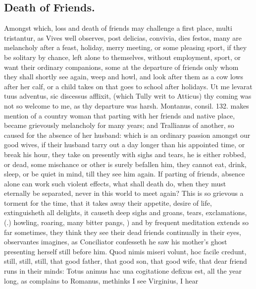 {{\subsection{Death of Friends.}
Amongst which, loss and death of friends may
challenge a first place, multi tristantur, as Vives well
observes, post delicias, convivia, dies festos, many are melancholy
after a feast, holiday, merry meeting, or some pleasing sport, if they
be solitary by chance, left alone to themselves, without employment,
sport, or want their ordinary companions, some at the departure of
friends only whom they shall shortly see again, weep and howl, and look
after them as a cow lows after her calf, or a child takes on that goes
to school after holidays. Ut me levarat tuus adventus, sic discessus
afflixit, (which Tully writ to Atticus) thy coming was not so
welcome to me, as thy departure was harsh. Montanus, consil. 132. makes
mention of a country woman that parting with her friends and native
place, became grievously melancholy for many years; and Trallianus of
another, so caused for the absence of her husband: which is an ordinary
passion amongst our good wives, if their husband tarry out a day longer
than his appointed time, or break his hour, they take on presently with
sighs and tears, he is either robbed, or dead, some mischance or other
is surely befallen him, they cannot eat, drink, sleep, or be quiet in
mind, till they see him again. If parting of friends, absence alone can
work such violent effects, what shall death do, when they must
eternally be separated, never in this world to meet again? This is so
grievous a torment for the time, that it takes away their appetite,
desire of life, extinguisheth all delights, it causeth deep sighs and
groans, tears, exclamations,
(.) 
howling, roaring, many bitter pangs, ) and by frequent meditation extends so
far sometimes, they think they see their dead friends continually
in their eyes, observantes imagines, as Conciliator confesseth he saw
his mother's ghost presenting herself still before him. Quod nimis
miseri volunt, hoc facile credunt, still, still, still, that good
father, that good son, that good wife, that dear friend runs in their
minds: Totus animus hac una cogitatione defixus est, all the year long,
as \Pliny{} complains to Romanus, methinks I see Virginius, I hear
}}
